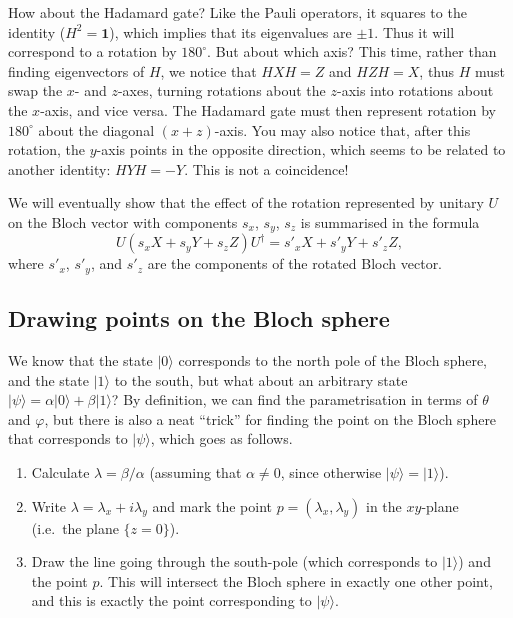 \documentclass[fleqn,a4paper]{article}
\providecommand{\tightlist}{\setlength{\itemsep}{0pt}\setlength{\parskip}{0pt}}
\theoremstyle{definition}
\theoremstyle{definition}
\theoremstyle{definition}
\theoremstyle{definition}
\theoremstyle{remark}
\begin{document}
How about the Hadamard gate?
Like the Pauli operators, it squares to the identity (\(H^2=\mathbf{1}\)), which implies that its eigenvalues are \(\pm 1\).
Thus it will correspond to a rotation by \({180}^{\circ}\).
But about which axis?
This time, rather than finding eigenvectors of \(H\), we notice that \(HXH=Z\) and \(HZH=X\), thus \(H\) must swap the \(x\)- and \(z\)-axes, turning rotations about the \(z\)-axis into rotations about the \(x\)-axis, and vice versa.
The Hadamard gate must then represent rotation by \({180}^{\circ}\) about the diagonal \((x+z)\)-axis.
You may also notice that, after this rotation, the \(y\)-axis points in the opposite direction, which seems to be related to another identity: \(HYH=-Y\).
This is not a coincidence!

We will eventually show that the effect of the rotation represented by unitary \(U\) on the Bloch vector with components \(s_x\), \(s_y\), \(s_z\) is summarised in the formula
\[
  U (s_x X + s_y Y + s_z Z) U^\dagger
  = s'_x X+ s'_y Y + s'_z Z,
\]
where \(s'_x\), \(s'_y\), and \(s'_z\) are the components of the rotated Bloch vector.

\hypertarget{drawing-points-on-the-bloch-sphere}{%
\subsection{Drawing points on the Bloch sphere}\label{drawing-points-on-the-bloch-sphere}}

We know that the state \(|0\rangle\) corresponds to the north pole of the Bloch sphere, and the state \(|1\rangle\) to the south, but what about an arbitrary state \(|\psi\rangle=\alpha|0\rangle+\beta|1\rangle\)?
By definition, we can find the parametrisation in terms of \(\theta\) and \(\varphi\), but there is also a neat ``trick'' for finding the point on the Bloch sphere that corresponds to \(|\psi\rangle\), which goes as follows.

\begin{enumerate}
\def\labelenumi{\arabic{enumi}.}
\tightlist
\item
  Calculate \(\lambda=\beta/\alpha\) (assuming that \(\alpha\neq0\), since otherwise \(|\psi\rangle=|1\rangle\)).
\item
  Write \(\lambda=\lambda_x+i\lambda_y\) and mark the point \(p=(\lambda_x,\lambda_y)\) in the \(xy\)-plane (i.e.~the plane \(\{z=0\}\)).
\item
  Draw the line going through the south-pole (which corresponds to \(|1\rangle\)) and the point \(p\). This will intersect the Bloch sphere in exactly one other point, and this is exactly the point corresponding to \(|\psi\rangle\).
\end{enumerate}
\end{document}
